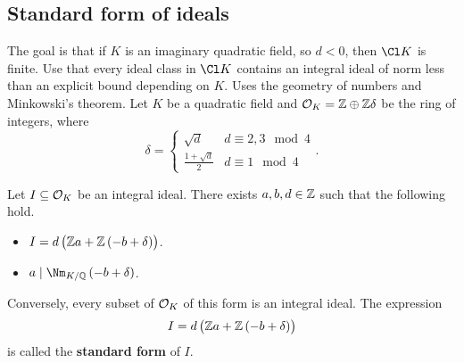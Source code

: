 \pagebreak

\subsection{Standard form of ideals}

The goal is that if $ K $ is an imaginary quadratic field, so $ d < 0 $, then $ \Cl K $ is finite. Use that every ideal class in $ \Cl K $ contains an integral ideal of norm less than an explicit bound depending on $ K $. Uses the geometry of numbers and Minkowski's theorem. Let $ K $ be a quadratic field and $ \mathcal{O}_K = \mathbb{Z} \oplus \mathbb{Z}\delta $ be the ring of integers, where
$$ \delta =
\begin{cases}
\sqrt{d} & d \equiv 2, 3 \mod 4 \\
\tfrac{1 + \sqrt{d}}{2} & d \equiv 1 \mod 4
\end{cases}.
$$

\begin{proposition}
Let $ I \subseteq \mathcal{O}_K $ be an integral ideal. There exists $ a, b, d \in \mathbb{Z} $ such that the following hold.
\begin{itemize}
\item $ I = d\br{\ZZ a + \ZZ\br{-b + \delta}} $.
\item $ a \mid \Nm_{K / \QQ} \br{-b + \delta} $.
\end{itemize}
\end{proposition}

Conversely, every subset of $ \mathcal{O}_K $ of this form is an integral ideal. The expression
$$ I = d\br{\ZZ a + \ZZ\br{-b + \delta}} $$
is called the \textbf{standard form} of $ I $.

